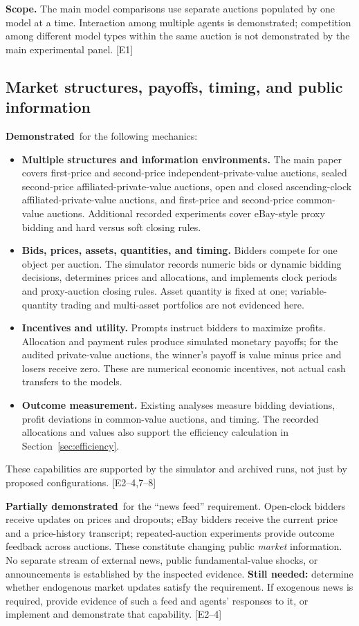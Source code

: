 \documentclass[11pt,letterpaper]{article}
\newcommand{\yes}{\textcolor{supported}{\textbf{Demonstrated}}}
\newcommand{\partiallydemonstrated}{\textcolor{conditional}{\textbf{Partially demonstrated}}}
\newcommand{\evidence}[1]{\textnormal{[E#1]}}
\begin{document}
\textbf{Scope.} The main model comparisons use separate auctions populated by
one model at a time. Interaction among multiple agents is demonstrated;
competition among different model types within the same auction is not
demonstrated by the main experimental panel. \evidence{1}

\subsection{Market structures, payoffs, timing, and public information}

\yes\ for the following mechanics:
\begin{itemize}
  \item \textbf{Multiple structures and information environments.} The main
  paper covers first-price and second-price independent-private-value auctions,
  sealed second-price affiliated-private-value auctions, open and closed
  ascending-clock affiliated-private-value auctions, and first-price and
  second-price common-value auctions. Additional recorded experiments cover
  eBay-style proxy bidding and hard versus soft closing rules.
  \item \textbf{Bids, prices, assets, quantities, and timing.} Bidders compete
  for one object per auction. The simulator records numeric bids or dynamic
  bidding decisions, determines prices and allocations, and implements clock
  periods and proxy-auction closing rules. Asset quantity is fixed at one;
  variable-quantity trading and multi-asset portfolios are not evidenced here.
  \item \textbf{Incentives and utility.} Prompts instruct bidders to maximize
  profits. Allocation and payment rules produce simulated monetary payoffs;
  for the audited private-value auctions, the winner's payoff is value minus
  price and losers receive zero. These are numerical economic incentives,
  not actual cash transfers to the models.
  \item \textbf{Outcome measurement.} Existing analyses measure bidding
  deviations, profit deviations in common-value auctions, and timing. The
  recorded allocations and values also support the efficiency calculation
  in Section~\ref{sec:efficiency}.
\end{itemize}
These capabilities are supported by the simulator and archived runs, not just
by proposed configurations. \evidence{2--4,7--8}

\partiallydemonstrated\ for the ``news feed'' requirement. Open-clock bidders receive
updates on prices and dropouts; eBay bidders receive the current price and a
price-history transcript; repeated-auction experiments provide outcome
feedback across auctions. These constitute changing public \emph{market}
information. No separate stream of external news, public fundamental-value
shocks, or announcements is established by the inspected evidence.
\textbf{Still needed:} determine whether endogenous market updates satisfy
the requirement. If exogenous news is required, provide evidence of such a
feed and agents' responses to it, or implement and demonstrate that capability.
\evidence{2--4}
\end{document}
